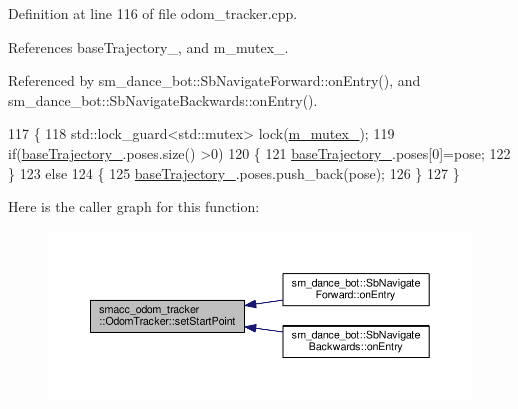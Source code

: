 Definition at line 116 of file odom\+\_\+tracker.\+cpp.



References base\+Trajectory\+\_\+, and m\+\_\+mutex\+\_\+.



Referenced by sm\+\_\+dance\+\_\+bot\+::\+Sb\+Navigate\+Forward\+::on\+Entry(), and sm\+\_\+dance\+\_\+bot\+::\+Sb\+Navigate\+Backwards\+::on\+Entry().


\begin{DoxyCode}
117 \{
118     std::lock\_guard<std::mutex> lock(\hyperlink{classsmacc__odom__tracker_1_1OdomTracker_ad65e52bfd236e073940808c35f2bed8c}{m\_mutex\_});
119     \textcolor{keywordflow}{if}(\hyperlink{classsmacc__odom__tracker_1_1OdomTracker_ac3a17be46ab833632c5f63e75c840dc7}{baseTrajectory\_}.poses.size() >0)
120     \{
121         \hyperlink{classsmacc__odom__tracker_1_1OdomTracker_ac3a17be46ab833632c5f63e75c840dc7}{baseTrajectory\_}.poses[0]=pose;
122     \}
123     \textcolor{keywordflow}{else}
124     \{
125         \hyperlink{classsmacc__odom__tracker_1_1OdomTracker_ac3a17be46ab833632c5f63e75c840dc7}{baseTrajectory\_}.poses.push\_back(pose);
126     \}
127 \}
\end{DoxyCode}


Here is the caller graph for this function\+:
\nopagebreak
\begin{figure}[H]
\begin{center}
\leavevmode
\includegraphics[width=350pt]{classsmacc__odom__tracker_1_1OdomTracker_a5ac7c4770b3e29b74571ef65377048ee_icgraph}
\end{center}
\end{figure}



